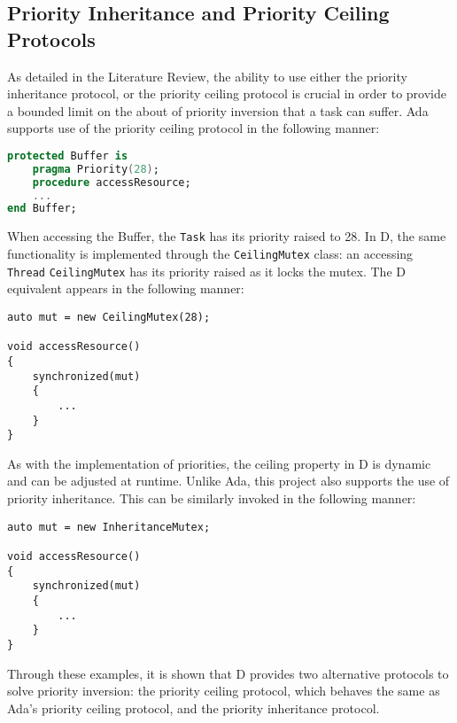 \subsection{Priority Inheritance and Priority Ceiling Protocols}
As detailed in the Literature Review, the ability to use either the priority
inheritance protocol, or the priority ceiling protocol is crucial in order to
provide a bounded limit on the about of priority inversion that a task can
suffer. Ada supports use of the priority ceiling protocol in the following
manner: 
\begin{lstlisting}[basicstyle=\small,language=Ada]
protected Buffer is 
    pragma Priority(28); 
    procedure accessResource; 
    ...
end Buffer; 
\end{lstlisting}
When accessing the Buffer, the \texttt{Task} has its priority raised
to 28. 
In D, the same functionality is implemented through 
the \texttt{CeilingMutex} class: an accessing \texttt{Thread} 
\texttt{CeilingMutex} has its priority raised as it locks the mutex. 
The D equivalent appears in the following manner: 
\begin{lstlisting}[basicstyle=\small]
auto mut = new CeilingMutex(28); 

void accessResource()
{
    synchronized(mut)
    {
        ...
    }
}
\end{lstlisting}
As with the implementation of priorities, the ceiling property in D is dynamic 
and can be adjusted at runtime. 
Unlike Ada, this project also supports the use of priority inheritance. 
This can be similarly invoked in the following manner: 
\begin{lstlisting}[basicstyle=\small]
auto mut = new InheritanceMutex; 

void accessResource()
{
    synchronized(mut)
    {
        ...
    }
}
\end{lstlisting}
Through these examples, it is shown that D provides two alternative protocols
to solve priority inversion: the priority ceiling protocol, which behaves the
same as Ada's priority ceiling protocol, and the priority inheritance protocol. 

